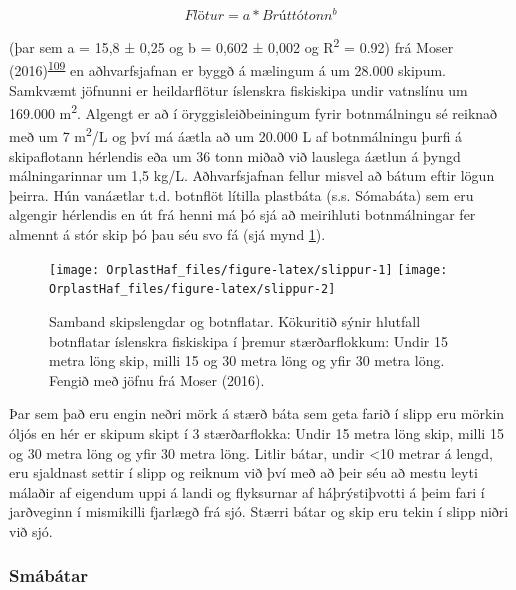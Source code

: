 \documentclass[icelandic,]{book}
\begin{document}
\begin{equation} 
  Flötur = a*Brúttótonn^b
  \label{eq:WSA}
\end{equation}

(þar sem a = 15,8 ± 0,25 og b = 0,602 ± 0,002 og R\textsuperscript{2} = 0.92) frá Moser (2016)\textsuperscript{\protect\hyperlink{ref-Moser2016}{109}} en aðhvarfsjafnan er byggð á mælingum á um 28.000 skipum. Samkvæmt jöfnunni er heildarflötur íslenskra fiskiskipa undir vatnslínu um 169.000 m\textsuperscript{2}. Algengt er að í öryggisleiðbeiningum fyrir botnmálningu sé reiknað með um 7 m\textsuperscript{2}/L og því má áætla að um 20.000 L af botnmálningu þurfi á skipaflotann hérlendis eða um 36 tonn miðað við lauslega áætlun á þyngd málningarinnar um 1,5 kg/L. Aðhvarfsjafnan fellur misvel að bátum eftir lögun þeirra. Hún vanáætlar t.d. botnflöt lítilla plastbáta (s.s. Sómabáta) sem eru algengir hérlendis en út frá henni má þó sjá að meirihluti botnmálningar fer almennt á stór skip þó þau séu svo fá (sjá mynd \ref{fig:slippur}).

\begin{figure}

{\centering \texttt{[image: OrplastHaf\_files/figure-latex/slippur-1]} \texttt{[image: OrplastHaf\_files/figure-latex/slippur-2]} 

}

\caption{Samband skipslengdar og botnflatar. Kökuritið sýnir hlutfall botnflatar íslenskra fiskiskipa í þremur stærðarflokkum: Undir 15 metra löng skip, milli 15 og 30 metra löng og yfir 30 metra löng. Fengið með jöfnu frá Moser (2016).}\label{fig:slippur}
\end{figure}

Þar sem það eru engin neðri mörk á stærð báta sem geta farið í slipp eru mörkin óljós en hér er skipum skipt í 3 stærðarflokka: Undir 15 metra löng skip, milli 15 og 30 metra löng og yfir 30 metra löng. Litlir bátar, undir \textless{}10 metrar á lengd, eru sjaldnast settir í slipp og reiknum við því með að þeir séu að mestu leyti málaðir af eigendum uppi á landi og flyksurnar af háþrýstiþvotti á þeim fari í jarðveginn í mismikilli fjarlægð frá sjó. Stærri bátar og skip eru tekin í slipp niðri við sjó.

\hypertarget{smabatar}{%
\subsubsection*{Smábátar}\label{smabatar}}
\end{document}
